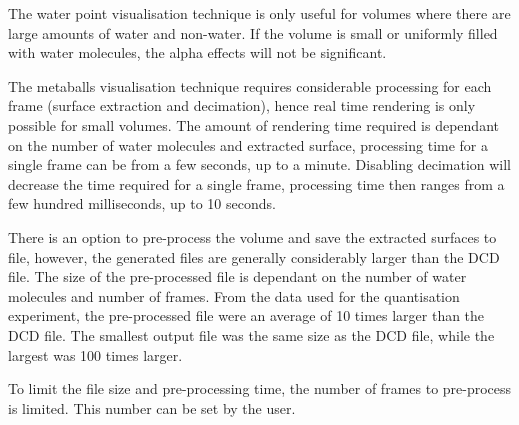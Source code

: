 The water point visualisation technique is only useful for volumes where there
are large amounts of water and non-water. If the volume is small or uniformly
filled with water molecules, the alpha effects will not be significant.

The metaballs visualisation technique requires considerable processing for each
frame (surface extraction and decimation), hence real time rendering is only
possible for small volumes. The amount of rendering time required is dependant
on the number of water molecules and extracted surface, processing time for a
single frame can be from a few seconds, up to a minute. Disabling decimation
will decrease the time required for a single frame, processing time then ranges
from a few hundred milliseconds, up to 10 seconds.

There is an option to pre-process the volume and save the extracted surfaces to
file, however, the generated files are generally considerably larger than the
DCD file. The size of the pre-processed file is dependant on the number of
water molecules and number of frames. From the data used for the quantisation
experiment, the pre-processed file were an average of 10 times larger than the
DCD file. The smallest output file was the same size as the DCD file, while the
largest was 100 times larger.

To limit the file size and pre-processing time, the number of frames to
pre-process is limited. This number can be set by the user.



